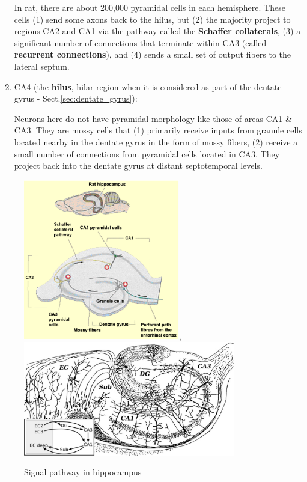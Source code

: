 \begin{enumerate}
  In rat, there are about 200,000 pyramidal cells in each hemisphere.
  These cells (1) send some axons back to the hilus, but (2) the majority
  project to regions CA2 and CA1 via the pathway called the {\bf Schaffer
  collaterals}, (3) a significant number of connections that terminate
  within CA3 (called {\bf recurrent connections}), and (4) sends a small set of
  output fibers to the lateral septum.
  
  \item CA4 (the {\bf hilus}, hilar region when it is considered as part of
  the dentate gyrus - Sect.\ref{sec:dentate_gyrus}): 
  
  Neurons here do not have pyramidal morphology like those of areas CA1 \& CA3.
  They are mossy cells that (1) primarily receive inputs from granule cells
  located nearby in the dentate gyrus in the form of mossy fibers, 
  (2) receive a small number of connections from pyramidal cells located in CA3. 
  They project back into the dentate gyrus at distant septotemporal levels.
  
\end{enumerate}


\begin{figure}[hbt]
  \centerline{\includegraphics[height=7cm,
    angle=0]{./images/hippocampus_signal.eps},
    \includegraphics[height=5cm,
    angle=0]{./images/hippocampus_pathways.eps}}
\caption{Signal pathway in hippocampus}
\label{fig:hippocampus_signal}
\end{figure}


